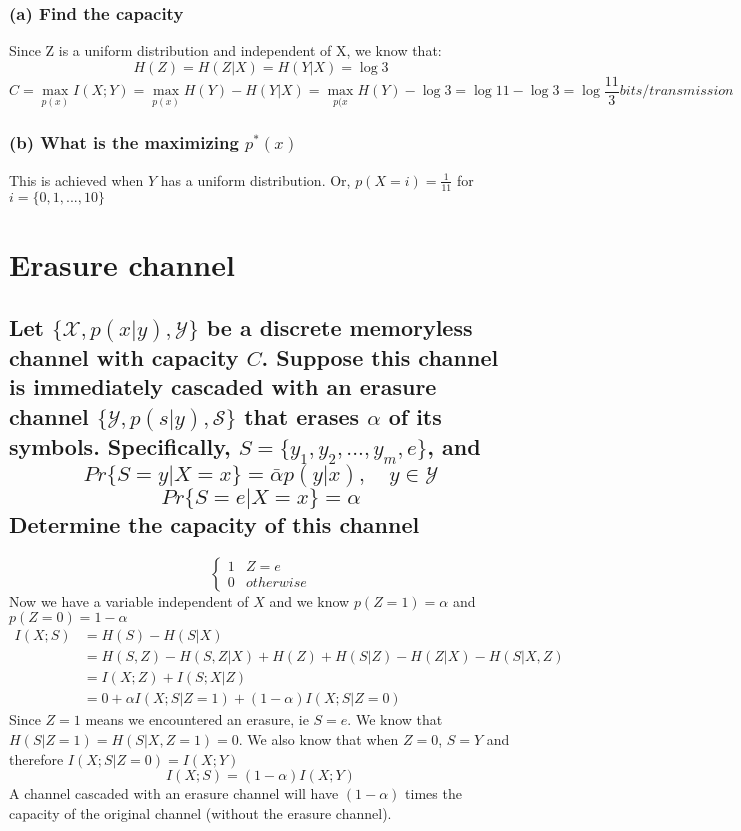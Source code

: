 \documentclass[11pt, oneside]{book}   	%
\begin{document}
\subsubsection{(a) Find the capacity}
Since Z is a uniform distribution and independent of X, we know that:
$$H(Z)=H(Z|X)=H(Y|X)=\log 3$$
$$C=\max_{p(x)}I(X;Y)=\max_{p(x)}H(Y)-H(Y|X)=\max_{p(x}H(Y)-\log 3= \log 11 - \log 3= \log \frac{11}{3} bits/transmission$$
\subsubsection{(b) What is the maximizing $p^*(x)$}
This is achieved when $Y$ has a uniform distribution.  Or, $p(X=i)=\frac{1}{11}$ for $i=\{0,1,...,10\}$

\section{Erasure channel}
\subsection*{Let $\{\mathcal{X}, p(x|y), \mathcal{Y}\}$ be a discrete memoryless channel with capacity $C$.  Suppose this channel is immediately cascaded with an erasure channel $\{ \mathcal{Y}, p(s|y), \mathcal{S} \}$ that erases $\alpha$ of its symbols.  Specifically, $S=\{y_1, y_2, ..., y_m, e\}$, and 
$$Pr\{S=y|X=x\}=\bar{\alpha}p(y|x), \quad y\in \mathcal{Y}$$
$$Pr\{S=e|X=x\}=\alpha$$
Determine the capacity of this channel}
\[ \begin{cases} 
      1 & Z = e \\
      0 & otherwise
   \end{cases}
\]
Now we have a variable independent of $X$ and we know $p(Z=1)=\alpha$ and $p(Z=0)=1-\alpha$
\begin{equation}\label{}
    \begin{split}
        I(X;S) & = H(S)-H(S|X)\\
        & = H(S,Z)-H(S,Z|X) + H(Z)+H(S|Z)-H(Z|X)-H(S|X,Z)\\
        & = I(X;Z)+I(S;X|Z)\\
        & = 0 + \alpha I(X;S|Z=1)+(1-\alpha)I(X;S|Z=0)
    \end{split}
\end{equation}
Since $Z=1$ means we encountered an erasure, ie $S=e$.  We know that $H(S|Z=1)=H(S|X,Z=1)=0$.  We also know that when $Z=0$, $S=Y$ and therefore $I(X;S|Z=0)=I(X;Y)$
$$I(X;S)=(1-\alpha)I(X;Y)$$  A channel cascaded with an erasure channel will have $(1-\alpha)$ times the capacity of the original channel (without the erasure channel).
\end{document}
